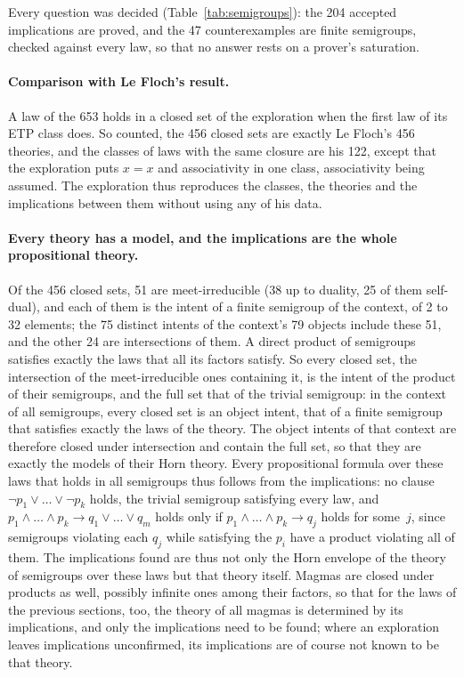 \documentclass[11pt,a4paper]{article}
\theoremstyle{definition}
\theoremstyle{remark}
\begin{document}
Every question was decided (Table~\ref{tab:semigroups}): the 204 accepted implications are proved, and the 47 counterexamples are finite semigroups, checked against every law, so that no answer rests on a prover's saturation.

\paragraph{Comparison with Le Floch's result.} A law of the 653 holds in a closed set of the exploration when the first law of its ETP class does. So counted, the 456 closed sets are exactly Le Floch's 456 theories, and the classes of laws with the same closure are his 122, except that the exploration puts $x = x$ and associativity in one class, associativity being assumed. The exploration thus reproduces the classes, the theories and the implications between them without using any of his data.

\paragraph{Every theory has a model, and the implications are the whole propositional theory.} Of the 456 closed sets, 51 are meet-irreducible (38 up to duality, 25 of them self-dual), and each of them is the intent of a finite semigroup of the context, of 2 to 32 elements; the 75 distinct intents of the context's 79 objects include these 51, and the other 24 are intersections of them. A direct product of semigroups satisfies exactly the laws that all its factors satisfy. So every closed set, the intersection of the meet-irreducible ones containing it, is the intent of the product of their semigroups, and the full set that of the trivial semigroup: in the context of all semigroups, every closed set is an object intent, that of a finite semigroup that satisfies exactly the laws of the theory. The object intents of that context are therefore closed under intersection and contain the full set, so that they are exactly the models of their Horn theory. Every propositional formula over these laws that holds in all semigroups thus follows from the implications: no clause $\neg p_1 \vee \dots \vee \neg p_k$ holds, the trivial semigroup satisfying every law, and $p_1 \wedge \dots \wedge p_k \to q_1 \vee \dots \vee q_m$ holds only if $p_1 \wedge \dots \wedge p_k \to q_j$ holds for some~$j$, since semigroups violating each $q_j$ while satisfying the $p_i$ have a product violating all of them. The implications found are thus not only the Horn envelope of the theory of semigroups over these laws but that theory itself. Magmas are closed under products as well, possibly infinite ones among their factors, so that for the laws of the previous sections, too, the theory of all magmas is determined by its implications, and only the implications need to be found; where an exploration leaves implications unconfirmed, its implications are of course not known to be that theory.
\end{document}

